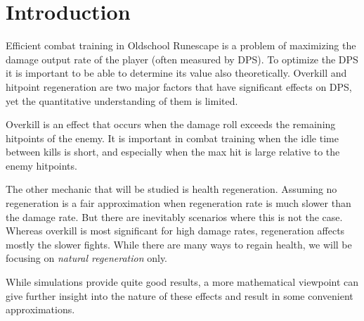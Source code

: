 \section{Introduction}
Efficient combat training in Oldschool Runescape is a problem of maximizing the damage output rate of the player (often measured by DPS). To optimize the DPS it is important to be able to determine its value also theoretically. Overkill and hitpoint regeneration are two major factors that have significant effects on DPS, yet the quantitative understanding of them is limited.

Overkill is an effect that occurs when the damage roll exceeds the remaining hitpoints of the enemy. It is important in combat training when the idle time between kills is short, and especially when the max hit is large relative to the enemy hitpoints.

The other mechanic that will be studied is health regeneration. Assuming no regeneration is a fair approximation when regeneration rate is much slower than the damage rate. But there are inevitably scenarios where this is not the case. Whereas overkill is most significant for high damage rates, regeneration affects mostly the slower fights. While there are many ways to regain health, we will be focusing on \textit{natural regeneration} only.

While simulations provide quite good results, a more mathematical viewpoint can give further insight into the nature of these effects and result in some convenient approximations.
